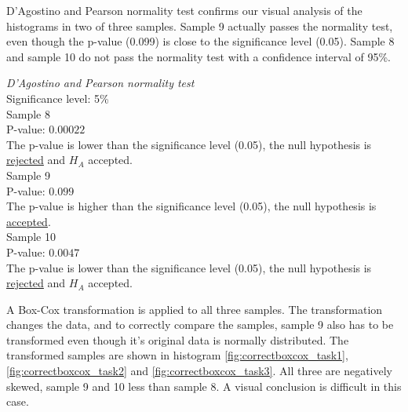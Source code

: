  D'Agostino and Pearson normality test confirms our visual analysis of the histograms in two of three samples. Sample 9 actually passes the normality test, even though the p-value (0.099) is close to the significance level (0.05). Sample 8 and sample 10 do not pass the normality test with a confidence interval of 95\%. \\[0.2cm]
 
 \begin{center}
 	\begin{tcolorbox}[width=0.8\textwidth]
 		\centering
 		\textit{D'Agostino and Pearson normality test}\\
 		Significance level: 5\%  \\[0.5cm]
 		
 		Sample 8 \\
 		P-value: $0.00022$\\
 		The p-value is lower than the significance level (0.05), the null hypothesis is \underline{rejected} and $H_A$ accepted.\\[0.5cm]
 		
 		Sample 9 \\
 		P-value: $0.099$ \\
 		The p-value is higher than the significance level (0.05), the null hypothesis is \underline{accepted}. \\[0.5cm]
 		
 		Sample 10 \\
 		P-value: $0.0047$ \\
 		The p-value is lower than the significance level (0.05), the null hypothesis is \underline{rejected} and $H_A$ accepted.\\[0.5cm]
 	\end{tcolorbox} 
 \end{center}

\vspace{0.2cm}

A Box-Cox transformation is applied to all three samples. The transformation changes the data, and to correctly compare the samples, sample 9 also has to be transformed even though it's original data is normally distributed. The transformed samples are shown in histogram \ref{fig:correctboxcox_task1}, \ref{fig:correctboxcox_task2} and \ref{fig:correctboxcox_task3}. All three are negatively skewed, sample 9 and 10 less than sample 8. A visual conclusion is difficult in this case. \\[0.2cm]


